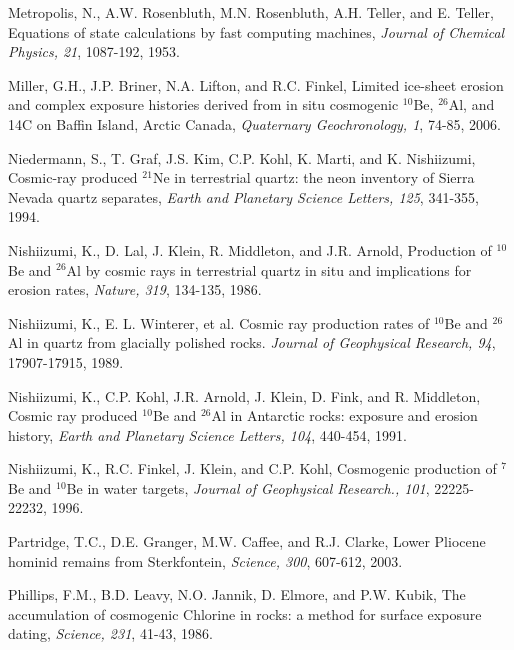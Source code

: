 \documentclass{article}
\begin{document}
\begin{description}
\item Metropolis,  N., A.W. Rosenbluth, M.N.  Rosenbluth, A.H. Teller,
  and  E. Teller, Equations  of state  calculations by  fast computing
  machines, {\it Journal of Chemical Physics, 21}, 1087-192, 1953.
  
\item Miller, G.H., J.P. Briner, N.A. Lifton, and R.C. Finkel, Limited
  ice-sheet  erosion and  complex exposure  histories derived  from in
  situ cosmogenic $^{10}$Be, $^{26}$Al, and 14C on Baffin Island, Arctic Canada,
  {\it Quaternary Geochronology, 1}, 74-85, 2006.

\item Niedermann, S., T. Graf, J.S.  Kim, C.P. Kohl, K.  Marti, and K. 
  Nishiizumi, Cosmic-ray produced $^{21}$Ne in terrestrial quartz: the neon
  inventory  of  Sierra  Nevada   quartz  separates,  {\it  Earth  and
    Planetary Science Letters, 125}, 341-355, 1994.

\item Nishiizumi, K., D. Lal, J. Klein, R. Middleton, and J.R. Arnold,
  Production of $^{10}$Be and $^{26}$Al  by cosmic rays in terrestrial quartz in
  situ and implications for erosion rates, {\it Nature, 319}, 134-135,
  1986.
  
\item Nishiizumi, K.,  E. L.  Winterer, et al.   Cosmic ray production
  rates of $^{10}$Be and $^{26}$Al in quartz from glacially polished rocks. {\it
    Journal of Geophysical Research, 94}, 17907-17915, 1989.

\item Nishiizumi, K., C.P. Kohl,  J.R. Arnold, J.  Klein, D. Fink, and
  R. Middleton, Cosmic ray produced  $^{10}$Be and $^{26}$Al in Antarctic rocks:
  exposure  and  erosion history,  {\it  Earth  and Planetary  Science
    Letters, 104}, 440-454, 1991.
  
\item Nishiizumi, K., R.C. Finkel, J. Klein, and C.P. Kohl, Cosmogenic
  production  of  $^7$Be and  $^{10}$Be  in  water  targets, {\it  Journal  of
    Geophysical Research., 101}, 22225-22232, 1996.
  
\item Partridge,  T.C., D.E.  Granger, M.W.  Caffee,  and R.J. Clarke,
  Lower  Pliocene  hominid remains  from  Sterkfontein, {\it  Science,
    300}, 607-612, 2003.
  
\item Phillips,  F.M., B.D.  Leavy, N.O.  Jannik, D. Elmore,  and P.W. 
  Kubik, The  accumulation of cosmogenic  Chlorine in rocks:  a method
  for surface exposure dating, {\it Science, 231}, 41-43, 1986.
  

\end{description}
\end{document}
